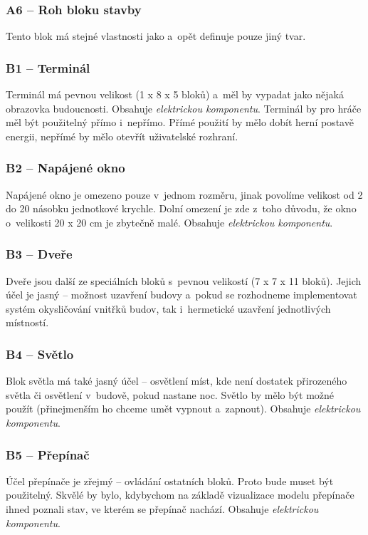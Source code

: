 \subsubsection{A6 -- Roh bloku stavby}
\label{blocks:A6}
Tento blok má stejné vlastnosti jako  a~opět definuje pouze jiný tvar.



\subsubsection{B1 -- Terminál}
\label{blocks:B1}
Terminál má pevnou velikost (1 x 8 x 5 bloků) a~měl by vypadat jako nějaká obrazovka budoucnosti. Obsahuje \textit{elektrickou komponentu}. Terminál by pro hráče měl být použitelný přímo i~nepřímo. Přímé použití by mělo dobít herní postavě energii, nepřímé by mělo otevřít uživatelské rozhraní.

\subsubsection{B2 -- Napájené okno}
\label{blocks:B2}
Napájené okno je omezeno pouze v~jednom rozměru, jinak povolíme velikost od 2 do 20 násobku jednotkové krychle. Dolní omezení je zde z~toho důvodu, že okno o~velikosti 20 x 20 cm je zbytečně malé. Obsahuje \textit{elektrickou komponentu}.


\subsubsection{B3 -- Dveře}
\label{blocks:B3}
Dveře jsou další ze speciálních bloků s~pevnou velikostí (7 x 7 x 11 bloků). Jejich účel je jasný -- možnost uzavření budovy a~pokud se rozhodneme implementovat systém okysličování vnitřků budov, tak i~hermetické uzavření jednotlivých místností.


\subsubsection{B4 -- Světlo}
\label{blocks:B4}
Blok světla má také jasný účel -- osvětlení míst, kde není dostatek přirozeného světla či osvětlení v~budově, pokud nastane noc. Světlo by mělo být možné použít (přinejmenším ho chceme umět vypnout a~zapnout). Obsahuje \textit{elektrickou komponentu}. 


\subsubsection{B5 -- Přepínač}
\label{blocks:B5}
Účel přepínače je zřejmý -- ovládání ostatních bloků. Proto bude muset být použitelný. Skvělé by bylo, kdybychom na základě vizualizace modelu přepínače ihned poznali stav, ve kterém se přepínač nachází. Obsahuje \textit{elektrickou komponentu}. 


